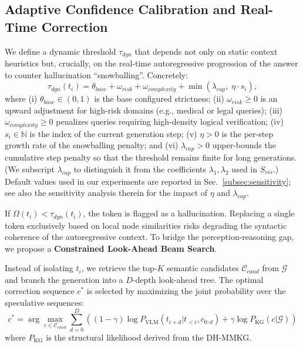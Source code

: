 \subsection{Adaptive Confidence Calibration and Real-Time Correction}
\label{sec:calibration}
We define a dynamic threshold $\tau_{dyn}$ that depends not only on static context heuristics but, crucially, on the real-time autoregressive progression of the answer to counter hallucination ``snowballing''. Concretely:
\begin{equation}
\tau_{dyn}(t_i) = \theta_{base} + \omega_{risk} + \omega_{complexity} + \min\!\left(\lambda_{cap},\; \eta \cdot s_i\right),
\end{equation}
where (i) $\theta_{base} \in (0,1)$ is the base configured strictness; (ii) $\omega_{risk} \geq 0$ is an upward adjustment for high-risk domains (e.g., medical or legal queries); (iii) $\omega_{complexity} \geq 0$ penalizes queries requiring high-density logical verification; (iv) $s_i \in \mathbb{N}$ is the index of the current generation step; (v) $\eta > 0$ is the per-step growth rate of the snowballing penalty; and (vi) $\lambda_{cap} > 0$ upper-bounds the cumulative step penalty so that the threshold remains finite for long generations. (We subscript $\lambda_{cap}$ to distinguish it from the coefficients $\lambda_1, \lambda_2$ used in $S_{vis}$.) Default values used in our experiments are reported in Sec.~\ref{subsec:sensitivity}; see also the sensitivity analysis therein for the impact of $\eta$ and $\lambda_{cap}$.

If $\Omega(t_i) < \tau_{dyn}(t_i)$, the token is flagged as a hallucination. Replacing a single token exclusively based on local node similarities risks degrading the syntactic coherence of the autoregressive context. To bridge the perception-reasoning gap, we propose a \textbf{Constrained Look-Ahead Beam Search}.

Instead of isolating $t_i$, we retrieve the top-$K$ semantic candidates $\mathcal{C}_{cand}$ from $\mathcal{G}$ and branch the generation into a $D$-depth look-ahead tree. The optimal correction sequence $c^*$ is selected by maximizing the joint probability over the speculative sequences:
\begin{equation}
c^* = \arg\max_{c \in \mathcal{C}_{cand}} \sum_{d=0}^{D} \left( (1-\gamma) \log P_{\text{VLM}}(t_{i+d} | t_{<i}, c_{0:d}) + \gamma \log P_{\text{KG}}(c | \mathcal{G}) \right)
\end{equation}
where $P_{\text{KG}}$ is the structural likelihood derived from the DH-MMKG.

